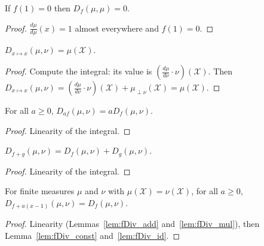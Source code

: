\begin{lemma}
  \label{lem:fDiv_self}
  \leanok
  If $f(1) = 0$ then $D_{f}(\mu, \mu) = 0$.
\end{lemma}

\begin{proof} \leanok
$\frac{d \mu}{d \mu}(x) = 1$ almost everywhere and $f(1) = 0$.
\end{proof}

\begin{lemma}
  \label{lem:fDiv_id}
  \leanok
  $D_{x \mapsto x}(\mu, \nu) = \mu(\mathcal X)$.
\end{lemma}

\begin{proof} \leanok
Compute the integral: its value is $(\frac{d\mu}{d\nu}\cdot \nu)(\mathcal X)$. Then
$D_{x\mapsto x}(\mu, \nu) = (\frac{d\mu}{d\nu}\cdot \nu)(\mathcal X) + \mu_{\perp \nu}(\mathcal X) = \mu (\mathcal X)$.
\end{proof}

\begin{lemma}
  \label{lem:fDiv_mul}
  \leanok
  For all $a \ge 0$, $D_{a f}(\mu, \nu) = a D_{f}(\mu, \nu)$.
\end{lemma}

\begin{proof}\leanok
Linearity of the integral.
\end{proof}

\begin{lemma}
  \label{lem:fDiv_add}
  \leanok
  $D_{f + g}(\mu, \nu) = D_f(\mu, \nu) + D_g(\mu, \nu)$.
\end{lemma}

\begin{proof}\leanok
Linearity of the integral.
\end{proof}

\begin{lemma}
  \label{lem:fDiv_add_linear}
  \leanok
  For finite measures $\mu$ and $\nu$ with $\mu(\mathcal X) = \nu(\mathcal X)$, for all $a \ge 0$, $D_{f + a(x - 1)}(\mu, \nu) = D_{f}(\mu, \nu)$.
\end{lemma}

\begin{proof}\leanok
{}
Linearity (Lemmas~\ref{lem:fDiv_add} and~\ref{lem:fDiv_mul}), then Lemma~\ref{lem:fDiv_const} and~\ref{lem:fDiv_id}.
\end{proof}


